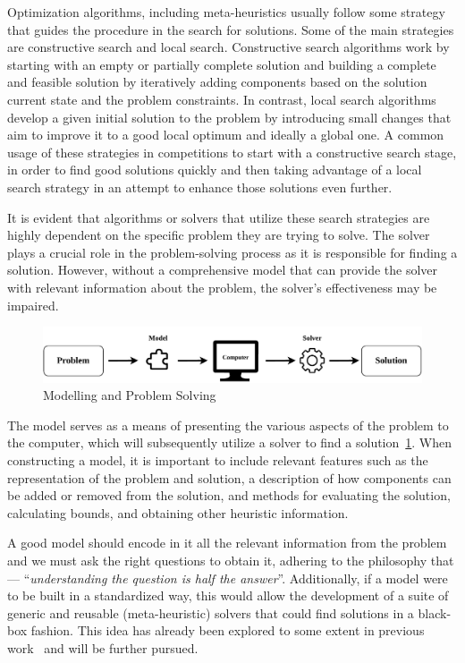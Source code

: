 Optimization algorithms, including meta-heuristics usually follow some strategy
that guides the procedure in the search for solutions. Some of the main
strategies are constructive search and local search. Constructive search
algorithms work by starting with an empty or partially complete solution  and
building a complete and feasible solution by iteratively adding components
based on the solution current state and the problem constraints. In contrast,
local search algorithms develop a given initial solution to the problem by
introducing small changes that aim to improve it to a good local optimum and
ideally a global one. A common usage of these strategies in competitions to
start with a constructive search stage, in order to find good solutions quickly
and then taking advantage of a local search strategy in an attempt to enhance
those solutions even further.

It is evident that algorithms or solvers that utilize these search strategies
are highly dependent on the specific problem they are trying to solve. The
solver plays a crucial role in the problem-solving process as it is responsible
for finding a solution. However, without a comprehensive model that can provide
the solver with relevant information about the problem, the solver's
effectiveness may be impaired.

\begin{figure}[h]
  \centering
  \includegraphics[width=\textwidth,keepaspectratio]{../assets/modelling/modelling.pdf}
  \caption{Modelling and Problem Solving}
  \label{fig:problem-solving}
\end{figure}

The model serves as a means of presenting the various aspects of the problem to
the computer, which will subsequently utilize a solver to find a
solution~\ref{fig:problem-solving}. When constructing a model, it is important
to include relevant features such as the representation of the problem and
solution, a description of how components can be added or removed from the
solution, and methods for evaluating the solution, calculating bounds, and
obtaining other heuristic information.

A good model should encode in it all the relevant information from the problem
and we must ask the right questions to obtain it, adhering to the philosophy that ---
``\textit{understanding the question is half the answer}''. Additionally, if a
model were to be built in a standardized way, this would allow the development of
a suite of generic and reusable (meta-heuristic) solvers that could find
solutions in a black-box fashion. This idea has already been explored to some
extent in previous work~\cite{outeiro2021application,vieira2009uma} and will be
further pursued.


